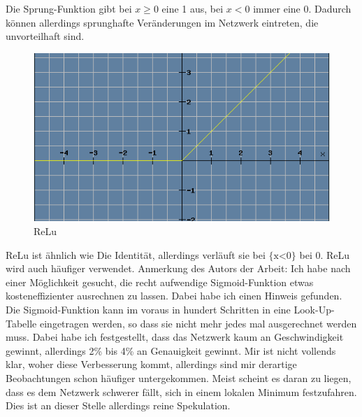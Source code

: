 \documentclass[12pt]{article}
\begin{document}
Die Sprung-Funktion gibt bei $x \ge 0$ eine 1 aus, bei $x<0$ immer eine 0.
Dadurch können allerdings sprunghafte Veränderungen im Netzwerk eintreten, die unvorteilhaft sind.
\begin{figure}[H]
\centering
\includegraphics[scale=0.60]{./Images/Pasted image 20230912200758.png}
\caption{ReLu}
\label{ReLu}
\end{figure}
ReLu ist ähnlich wie Die Identität, allerdings verläuft sie bei $\text{\{x<0\}}$ bei 0.
ReLu wird auch häufiger verwendet. Anmerkung des Autors der Arbeit: Ich habe nach einer Möglichkeit gesucht, die recht aufwendige Sigmoid-Funktion etwas kosteneffizienter ausrechnen zu lassen. Dabei habe ich einen Hinweis gefunden. Die Sigmoid-Funktion kann im voraus in hundert Schritten in eine Look-Up-Tabelle eingetragen werden, so dass sie nicht mehr jedes mal ausgerechnet werden muss. Dabei habe ich festgestellt, dass das Netzwerk kaum an Geschwindigkeit gewinnt, allerdings 2\% bis 4\% an Genauigkeit gewinnt. Mir ist nicht vollends klar, woher diese Verbesserung kommt, allerdings sind mir derartige Beobachtungen schon häufiger untergekommen. Meist scheint es daran zu liegen, dass es dem Netzwerk schwerer fällt, sich in einem lokalen Minimum festzufahren. Dies ist an dieser Stelle allerdings reine Spekulation.
\end{document}
